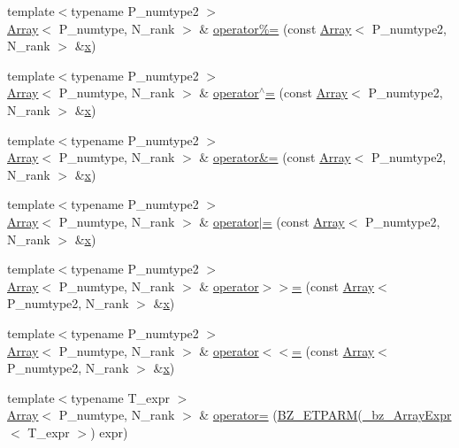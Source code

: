 \begin{DoxyCompactItemize}
\item 
{\footnotesize template$<$typename P\+\_\+numtype2 $>$ }\\\hyperlink{classArray}{Array}$<$ P\+\_\+numtype, N\+\_\+rank $>$ \& \hyperlink{classArray_ace0c01a7327d56e17aa2a64799caccd9}{operator\%=} (const \hyperlink{classArray}{Array}$<$ P\+\_\+numtype2, N\+\_\+rank $>$ \&\hyperlink{vecnorm1_8cc_ac73eed9e41ec09d58f112f06c2d6cb63}{x})
\item 
{\footnotesize template$<$typename P\+\_\+numtype2 $>$ }\\\hyperlink{classArray}{Array}$<$ P\+\_\+numtype, N\+\_\+rank $>$ \& \hyperlink{classArray_accbd0ed1fd5b55b665636f3004e7305e}{operator$^\wedge$=} (const \hyperlink{classArray}{Array}$<$ P\+\_\+numtype2, N\+\_\+rank $>$ \&\hyperlink{vecnorm1_8cc_ac73eed9e41ec09d58f112f06c2d6cb63}{x})
\item 
{\footnotesize template$<$typename P\+\_\+numtype2 $>$ }\\\hyperlink{classArray}{Array}$<$ P\+\_\+numtype, N\+\_\+rank $>$ \& \hyperlink{classArray_a028b66e32d704e07c0a2eb30345f1786}{operator\&=} (const \hyperlink{classArray}{Array}$<$ P\+\_\+numtype2, N\+\_\+rank $>$ \&\hyperlink{vecnorm1_8cc_ac73eed9e41ec09d58f112f06c2d6cb63}{x})
\item 
{\footnotesize template$<$typename P\+\_\+numtype2 $>$ }\\\hyperlink{classArray}{Array}$<$ P\+\_\+numtype, N\+\_\+rank $>$ \& \hyperlink{classArray_aa5bdce91cb189c6d9820de72d500aaea}{operator$\vert$=} (const \hyperlink{classArray}{Array}$<$ P\+\_\+numtype2, N\+\_\+rank $>$ \&\hyperlink{vecnorm1_8cc_ac73eed9e41ec09d58f112f06c2d6cb63}{x})
\item 
{\footnotesize template$<$typename P\+\_\+numtype2 $>$ }\\\hyperlink{classArray}{Array}$<$ P\+\_\+numtype, N\+\_\+rank $>$ \& \hyperlink{classArray_af11084a54cabef1e5f972235439aaa47}{operator$>$$>$=} (const \hyperlink{classArray}{Array}$<$ P\+\_\+numtype2, N\+\_\+rank $>$ \&\hyperlink{vecnorm1_8cc_ac73eed9e41ec09d58f112f06c2d6cb63}{x})
\item 
{\footnotesize template$<$typename P\+\_\+numtype2 $>$ }\\\hyperlink{classArray}{Array}$<$ P\+\_\+numtype, N\+\_\+rank $>$ \& \hyperlink{classArray_a927eee3d3e3ed30a88546901a202bdf2}{operator$<$$<$=} (const \hyperlink{classArray}{Array}$<$ P\+\_\+numtype2, N\+\_\+rank $>$ \&\hyperlink{vecnorm1_8cc_ac73eed9e41ec09d58f112f06c2d6cb63}{x})
\item 
{\footnotesize template$<$typename T\+\_\+expr $>$ }\\\hyperlink{classArray}{Array}$<$ P\+\_\+numtype, N\+\_\+rank $>$ \& \hyperlink{classArray_a1707050257efa6eabb7918d9aa244c87}{operator=} (\hyperlink{tuning_8h_a92a6f3aa8f4cd5ac9b4239c449892bb7}{B\+Z\+\_\+\+E\+T\+P\+A\+R\+M}(\hyperlink{class__bz__ArrayExpr}{\+\_\+bz\+\_\+\+Array\+Expr}$<$ T\+\_\+expr $>$) expr)

\end{DoxyCompactItemize}
